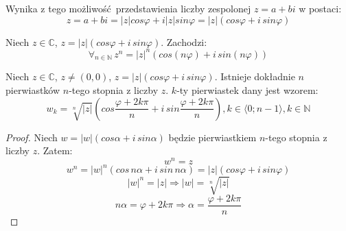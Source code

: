 Wynika z tego możliwość przedstawienia liczby zespolonej $z = a + bi$ w postaci:
\begin{equation*}
    z = a + bi = \mathopen|z\mathclose| cos \varphi + i \mathopen|z\mathclose| sin \varphi = \mathopen|z\mathclose|(cos \varphi + i\, sin \varphi)
\end{equation*}
\begin{theorem}
    Niech $z \in \mathds{C}$, $z = \mathopen|z\mathclose|(cos \varphi + i\, sin \varphi)$. Zachodzi:
    \begin{equation*}
        \forall_{n \in \mathds{N}} \, z^n = {\mathopen|z\mathclose|}^n (cos(n\varphi) + i\, sin(n\varphi))
    \end{equation*}
\end{theorem}
\begin{theorem}
    Niech $z \in \mathds{C}$, $z \neq (0,0)$, $z = \mathopen|z\mathclose|(cos\varphi + i\, sin\varphi)$.
    Istnieje dokładnie $n$ pierwiastków $n$-tego stopnia z liczby $z$. $k$-ty pierwiastek dany jest wzorem:
    \begin{equation*}
        w_k = \sqrt[n]{\mathopen|z\mathclose|}\left(cos\frac{\varphi+2k\pi}{n} + i\, sin \frac{\varphi+2k\pi}{n}\right), k \in \langle0; n-1 \rangle, k \in \mathds{N}
    \end{equation*}
    \begin{proof}
        Niech $w = \mathopen|w\mathclose|(cos \alpha + i\, sin \alpha)$ będzie pierwiastkiem $n$-tego stopnia z liczby $z$. Zatem:
        \begin{equation*}
            w^n = z
        \end{equation*}
        \begin{equation*}
            w^n = {\mathopen|w\mathclose|}^n(cos\, n\alpha + i\, sin\, n\alpha) = \mathopen|z\mathclose|(cos\varphi + i\, sin\varphi)
        \end{equation*}
        \begin{equation*}
            {\mathopen|w\mathclose|}^n = \mathopen|z\mathclose| \Longrightarrow \mathopen|w\mathclose| = \sqrt[n]{\mathopen|z\mathclose|}
        \end{equation*}
        \begin{equation*}
            n\alpha = \varphi+2k\pi \Longrightarrow \alpha = \frac{\varphi+2k\pi}{n}
        \end{equation*}
    \end{proof}
\end{theorem}
